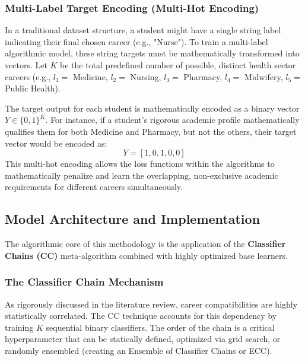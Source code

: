 \subsubsection{Multi-Label Target Encoding (Multi-Hot Encoding)}
In a traditional dataset structure, a student might have a single string label indicating their final chosen career (e.g., "Nurse"). To train a multi-label \parencite{tsoumakas2007multi} algorithmic model, these string targets must be mathematically transformed into vectors. Let $K$ be the total predefined number of possible, distinct health sector careers (e.g., $l_1=$ Medicine, $l_2=$ Nursing, $l_3=$ Pharmacy, $l_4=$ Midwifery, $l_5=$ Public Health). 

The target output for each student is mathematically encoded as a binary vector $Y \in \{0, 1\}^K$. For instance, if a student's rigorous academic profile mathematically qualifies them for both Medicine and Pharmacy, but not the others, their target vector would be encoded as:
\[
Y = [1, 0, 1, 0, 0]
\]
This multi-hot encoding allows the loss functions within the algorithms to mathematically penalize and learn the overlapping, non-exclusive academic requirements for different careers simultaneously.

\subsection{Model Architecture and Implementation}

The algorithmic core of this methodology is the application of the \textbf{Classifier Chains (CC)} meta-algorithm combined with highly optimized base learners.

\subsubsection{The Classifier Chain \parencite{read2011classifier} Mechanism}
As rigorously discussed in the literature review, career compatibilities are highly statistically correlated. The CC technique accounts for this dependency by training $K$ sequential binary classifiers. The order of the chain is a critical hyperparameter that can be statically defined, optimized via grid search, or randomly ensembled (creating an Ensemble of Classifier Chains \parencite{read2011classifier} or ECC). 

